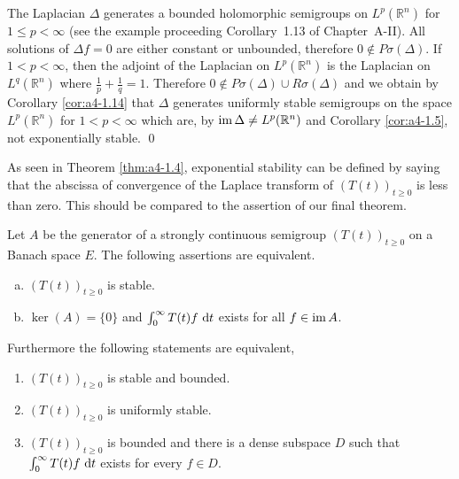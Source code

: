 \begin{example}\label{ex:a4-15}
The Laplacian $\Delta$ generates a bounded holomorphic semigroups on $L^{p}(\mathbb{R}^{n})$ for $1 \leq p < \infty$ (see the example proceeding
Corollary~1.13 of Chapter~A-II). 
All solutions of $\Delta f = 0$ are either constant
or unbounded, therefore $0 \not\in P\sigma(\Delta)$. 
If $1 < p < \infty$, then the adjoint
of the Laplacian on $L^{p}(\mathbb{R}^{n})$ is the Laplacian on $L^{q}(\mathbb{R}^{n})$ where
$\frac{1}{p} + \frac{1}{q} = 1$. 
Therefore $0 \not\in P\sigma(\Delta) \cup R\sigma(\Delta)$ and we obtain by Corollary \ref{cor:a4-1.14}
that $\Delta$ generates uniformly stable semigroups on the space $L^{p}(\mathbb{R}^{n})$
for $1 < p < \infty$ which are, by $\mathop{}\!\mathrm{im}\, \Delta \not= L^{p}(\mathbb{R}^{n})$ and Corollary \ref{cor:a4-1.5}, not exponentially stable. \qed
\end{example}

As seen in Theorem \ref{thm:a4-1.4}, exponential stability can be defined by saying that the abscissa of convergence of the Laplace transform of $(T(t))_{t \geq 0}$ is less than zero. 
This should be compared to the assertion of our final theorem.

\begin{theorem}\label{thm:a4-1.16}
Let $A$ be the generator of a strongly continuous semigroup $(T(t))_{t \geq 0}$ on a Banach space $E$. 
The following assertions are equivalent.
\begin{enumerate}[(a)]
\item $(T(t))_{t \geq 0}$ is stable.
\item $\ker(A) = \{0\}$ and $\int_{0}^{\infty} T(t)f \,\mathop{}\!\mathrm{d}{t}$ exists for all $f \in \mathop{}\!\mathrm{im}\, A$.
\end{enumerate}
Furthermore the following statements are equivalent,
\begin{enumerate}[(a$'$)]
\item $(T(t))_{t \geq 0}$ is stable and bounded.
\item $(T(t))_{t \geq 0}$ is uniformly stable.
\item $(T(t))_{t \geq 0}$ is bounded and there is a dense subspace $D$ such that $\int_{0}^{\infty} T(t)f \,\mathop{}\!\mathrm{d}{t}$ exists for every $f \in D$.
\end{enumerate}
\end{theorem}

